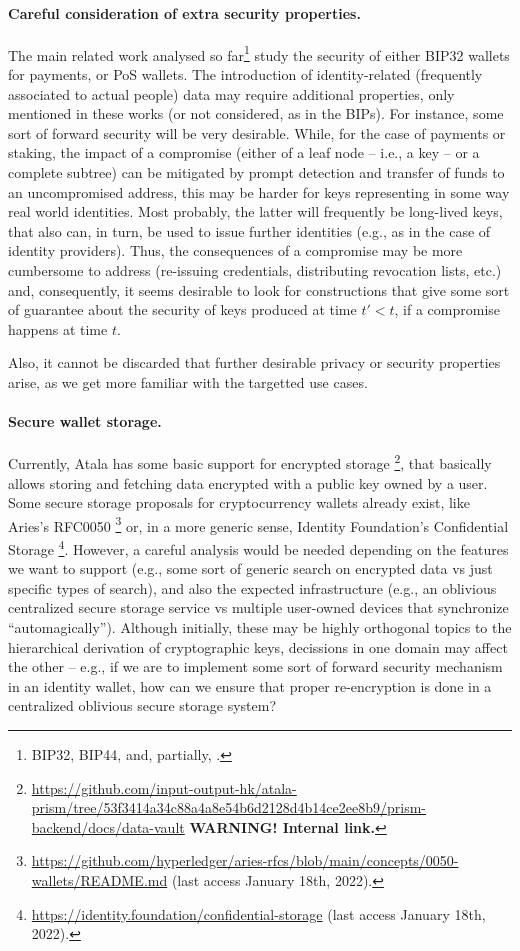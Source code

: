 \paragraph{Careful consideration of extra security properties.} %
The main related work analysed so far\footnote{BIP32, BIP44, \cite{def+21}
  and, partially, \cite{kkl20}.} study the security of either BIP32
wallets for payments, or PoS wallets. The introduction of identity-related
(frequently associated to actual people) data may require additional properties,
only mentioned in these works (or not considered, as in the BIPs). For instance,
some sort of forward security will be very desirable. While, for the case of
payments or staking, the impact of a compromise (either of a leaf node --
i.e., a key -- or a complete subtree) can be mitigated by prompt detection
and transfer of funds to an uncompromised address, this may be harder for
keys representing in some way real world identities. Most probably, the
latter will frequently be long-lived keys, that also can, in turn, be used
to issue further identities (e.g., as in the case of identity providers).
Thus, the consequences of a compromise may be more cumbersome to address
(re-issuing credentials, distributing revocation lists, etc.) and,
consequently, it seems desirable to look for constructions that give some
sort of guarantee about the security of keys produced at time $t' < t$, if a
compromise happens at time $t$.

Also, it cannot be discarded that further desirable privacy or security
properties arise, as we get more familiar with the targetted use cases.

\paragraph{Secure wallet storage.} %
Currently, Atala has some basic support for encrypted storage%
\footnote{\url{https://github.com/input-output-hk/atala-prism/tree/53f3414a34c88a4a8e54b6d2128d4b14ce2ee8b9/prism-backend/docs/data-vault}
  {\bf WARNING! Internal link.}}, that basically allows storing and
fetching data encrypted with a public key owned by a user. Some secure
storage proposals for cryptocurrency wallets already exist, like Aries's
RFC0050%
\footnote{\url{https://github.com/hyperledger/aries-rfcs/blob/main/concepts/0050-wallets/README.md}
  (last access January 18th, 2022).} or, in a more generic sense,
Identity Foundation's Confidential Storage%
\footnote{\url{https://identity.foundation/confidential-storage} (last access
  January 18th, 2022).}. However, a careful analysis would be needed depending
on the features we want to support (e.g., some sort of generic search on
encrypted data vs just specific types of search), and also the expected
infrastructure (e.g., an oblivious centralized secure storage service vs
multiple user-owned devices that synchronize ``automagically'').
%
Although initially, these may be highly orthogonal topics to the hierarchical
derivation of cryptographic keys, decissions in one domain may affect the other
-- e.g., if we are to implement some sort of forward security mechanism in
an identity wallet, how can we ensure that proper re-encryption is done in
a centralized oblivious secure storage system?

